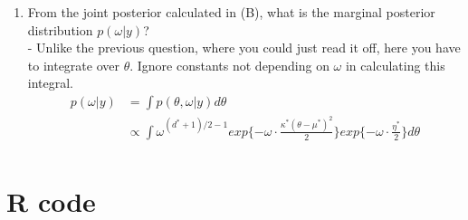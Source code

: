 \documentclass{homework}
\begin{document}
\begin{enumerate}[label=(\Alph*)]
\item  From the joint posterior calculated in (B), what is the marginal posterior distribution $p(\omega | y)$? \\ 
- Unlike the previous question, where you could just read it off, here you have to integrate over $\theta$. Ignore constants not depending on $\omega$ in calculating this integral.
\begin{equation} \begin{split}
p(\omega | y) & = \int p(\theta,\omega | y) d\theta \\
& \propto \int \omega^{(d^*+1)/2 - 1}exp\{ -\omega \cdot \frac{\kappa^*(\theta - \mu^*)^2}{2}\}exp\{-\omega \cdot \frac{\eta^*}{2}\} d\theta \\
\end{split} \end{equation}

\end{enumerate}

\clearpage

\appendix
\chapter{R code}
\label{chap:code}
\end{document}
